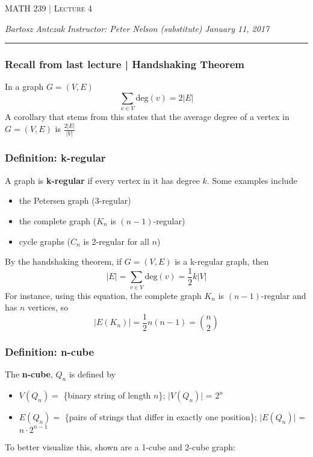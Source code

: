 \documentclass{report}
\newcommand{\lectureNum}{4}
\newcommand{\curDate}{January 11, 2017}
\newcommand{\course}{MATH 239}
\newcommand{\instructor}{Peter Nelson (substitute)}
\begin{document}
\begin{center}
\begin{Large}
\textsc{\course{} | Lecture \lectureNum{}}
\end{Large}
\end{center} 
\noindent \textit{Bartosz Antczak} \hfill
\textit{Instructor: \instructor{}} \hfill
\textit{\curDate{}}
\rule{\textwidth}{0.4pt}

\subsubsection{Recall from last lecture | Handshaking Theorem}
In a graph $G = (V, E)$
$$\displaystyle \sum_{v\in V} \mathrm{deg}(v) = 2 \vert E \vert$$
A corollary that stems from this states that the average degree of a vertex in $ G = (V, E)$ is $\displaystyle \frac{2 \vert E \vert}{\vert V \vert}$
\subsubsection{Definition: k-regular}
A graph is \textbf{k-regular} if every vertex in it has degree $k$. Some examples include
\begin{itemize}
\item the Petersen graph (3-regular)
\item the complete graph ($K_n$ is $(n - 1)$-regular)
\item cycle graphs ($C_n$ is 2-regular for all $n$)
\end{itemize}
By the handshaking theorem, if $G = (V, E)$ is a k-regular graph, then
$$\vert E \vert = \sum_{v \in V} \mathrm{deg}(v) = \frac{1}{2}k \vert V \vert$$
For instance, using this equation, the complete graph $K_n$ is $(n-1)$-regular and has $n$ vertices, so 
$$\vert E(K_n)\vert = \frac{1}{2}n(n-1) = {n \choose 2}$$
\subsubsection{Definition: n-cube}
The \textbf{n-cube}, $Q_n$ is defined by
\begin{itemize}
\item $V(Q_n) =$ \{binary string of length $n$\}; $\vert V(Q_n) \vert$ = $2^n$
\item $E(Q_n) =$ \{pairs of strings that differ in exactly one position\}; $\vert E(Q_n) \vert$ = $n \cdot 2^{n-1}$
\end{itemize}
To better visualize this, shown are a 1-cube and 2-cube graph:
\begin{center}
\end{center}
\end{document}
